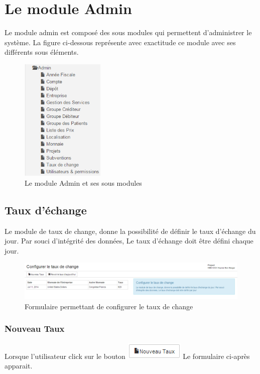 \documentclass[12pt,a4paper]{report}
\begin{document}
\chapter{Le module Admin}        
Le module admin est composé des sous modules qui permettent d'administrer le système. La figure ci-dessous représente avec exactitude ce module avec ses différents sous éléments.
\begin{figure}[h]
\begin{center}
\includegraphics[width=4cm]{pic/s_admin.png}
\end{center}
\caption{Le module Admin et ses sous modules}
\label{Le module Admin et ses sous menus}
\end{figure} 

\newpage
\section{Taux d'échange}
Le module de taux de change, donne la possibilité de définir le taux d'échange du jour. Par souci d'intégrité des données, Le taux d'échange doit être défini chaque jour.


\begin{figure}[h]
\begin{center}
\includegraphics[width=16cm]{pic/FormulaireConfigRate.png}
\end{center}
\caption{Formulaire permettant de configurer le taux de change}
\label{Formulaire permettant de configurer le taux de change}
\end{figure}

\subsection{Nouveau Taux}
Lorsque l'utilisateur click sur le bouton \includegraphics[scale=0.7]{pic/NouveauTaux.png}
 Le formulaire ci-après apparait.
\end{document}
